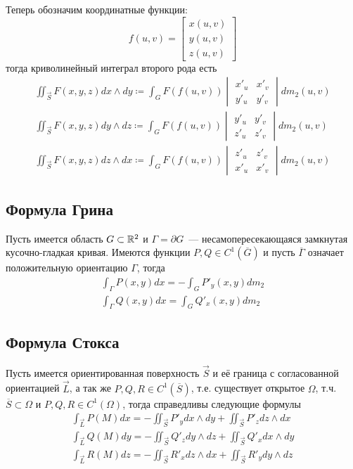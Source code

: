 \documentclass[main]{subfiles}
\begin{document}
Теперь обозначим координатные функции:
\[f(u, v) = \begin{bmatrix}
        x(u, v) \\
        y(u, v) \\
        z(u, v)
    \end{bmatrix}\]
тогда криволинейный интеграл второго рода есть
\begin{gather*}
    \iint_{\overrightarrow{S}} F(x, y, z) dx \wedge dy \coloneq \int_G F(f(u, v)) \begin{vmatrix}
        x'_u & x'_v \\
        y'_u & y'_v
    \end{vmatrix} dm_2(u, v) \\
    \iint_{\overrightarrow{S}} F(x, y, z) dy \wedge dz \coloneq \int_G F(f(u, v)) \begin{vmatrix}
        y'_u & y'_v \\
        z'_u & z'_v
    \end{vmatrix} dm_2(u, v) \\
    \iint_{\overrightarrow{S}} F(x, y, z) dz \wedge dx \coloneq \int_G F(f(u, v)) \begin{vmatrix}
        z'_u & z'_v \\
        x'_u & x'_v
    \end{vmatrix} dm_2(u, v)
\end{gather*}

\subsection{Формула Грина}
Пусть имеется область $G \subset \mathbb{R}^2$ и $\Gamma = \partial G$~--- несамопересекающаяся замкнутая кусочно-гладкая кривая.
Имеются функции $P, Q \in C^1(\overline{G})$ и пусть $\overline{\Gamma}$ означает положительную ориентацию $\Gamma$, тогда
\begin{gather*}
    \int_{\Gamma} P(x, y)dx = - \int_G P'_y (x,y) dm_2 \\
    \int_{\Gamma} Q(x, y)dx =  \int_G Q'_x (x,y) dm_2
\end{gather*}

\subsection{Формула Стокса}
Пусть имеется ориентированная поверхность $\overrightarrow{S}$ и её граница с согласованной ориентацией $\overrightarrow{L}$, а так же $P, Q, R \in C^1 (\overline{S})$, т.е. существует открытое $\Omega$, т.ч. $\overline{S} \subset \Omega$ и $P, Q, R \in C^1(\Omega)$, тогда справедливы следующие формулы
\begin{gather*}
    \int_{\overrightarrow{L}} P(M) dx = - \iint_{\overrightarrow{S}} P'_y dx \wedge dy + \iint_{\overrightarrow{S}} P'_z dz \wedge dx \\
    \int_{\overrightarrow{L}} Q(M) dy = - \iint_{\overrightarrow{S}} Q'_z dy \wedge dz + \iint_{\overrightarrow{S}} Q'_x dx \wedge dy \\
    \int_{\overrightarrow{L}} R(M) dz = - \iint_{\overrightarrow{S}} R'_x dz \wedge dx + \iint_{\overrightarrow{S}} R'_y dy \wedge dz
\end{gather*}
\end{document}
